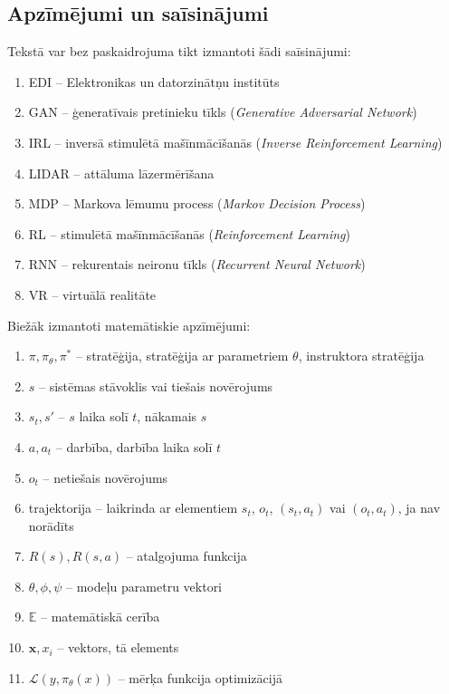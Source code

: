\documentclass[12pt, a4paper]{article}
\numberwithin{equation}{section} %
\begin{document}
\subsection*{Apzīmējumi un saīsinājumi}

Tekstā var bez paskaidrojuma tikt izmantoti šādi saīsinājumi:

\begin{enumerate}
    \item EDI -- Elektronikas un datorzinātņu institūts
    \item GAN -- ģeneratīvais pretinieku tīkls (\textit{Generative Adversarial Network})
    \item IRL -- inversā stimulētā mašīnmācīšanās (\textit{Inverse Reinforcement Learning})
    \item LIDAR -- attāluma lāzermērīšana
    \item MDP -- Markova lēmumu process (\textit{Markov Decision Process})
    \item RL -- stimulētā mašīnmācīšanās (\textit{Reinforcement Learning})
    \item RNN -- rekurentais neironu tīkls (\textit{Recurrent Neural Network})
    \item VR -- virtuālā realitāte
\end{enumerate}

Biežāk izmantoti matemātiskie apzīmējumi:

\begin{enumerate}
    \item $\pi, \pi_{\theta}, \pi^*$ -- stratēģija, stratēģija ar parametriem $\theta$, instruktora stratēģija
    \item $s$ -- sistēmas stāvoklis vai tiešais novērojums
    \item $s_t, s'$ -- $s$ laika solī $t$, nākamais $s$
    \item $a, a_t$ -- darbība, darbība laika solī $t$
    \item $o_t$ -- netiešais novērojums
    \item trajektorija -- laikrinda ar elementiem $s_t$, $o_t$, $(s_t, a_t)$ vai $(o_t, a_t)$, ja nav norādīts
    \item $R(s), R(s,a)$ -- atalgojuma funkcija
    \item $\theta, \phi, \psi$ -- modeļu parametru vektori
    \item $\mathbb{E}$ -- matemātiskā cerība
    \item $\boldsymbol{x}, x_i$ -- vektors, tā elements
    \item $\mathcal{L}(y, \pi_{\theta}(x))$ -- mērķa funkcija optimizācijā
\end{enumerate}
\end{document}
